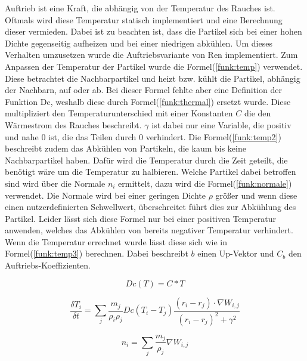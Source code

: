 \documentclass[intern,palatino]{cgBA}
\begin{document}
Auftrieb ist eine Kraft, die abhängig von der Temperatur des Rauches ist. Oftmals wird diese Temperatur statisch implementiert und eine Berechnung dieser vermieden. Dabei ist zu beachten ist, dass die Partikel sich bei einer hohen Dichte gegenseitig aufheizen und bei einer niedrigen abkühlen. Um dieses Verhalten umzusetzen wurde die Auftriebsvariante von Ren \cite{ren2016fast} implementiert.
\newline
Zum Anpassen der Temperatur der Partikel wurde die Formel(\ref{funk:temp}) verwendet. Diese betrachtet die Nachbarpartikel und heizt bzw. kühlt die Partikel, abhängig der Nachbarn, auf oder ab. Bei dieser Formel fehlte aber eine Definition der Funktion Dc, weshalb diese durch Formel(\ref{funk:thermal}) ersetzt wurde. Diese multipliziert den Temperaturunterschied mit einer Konstanten $C$ die den Wärmestrom des Rauches beschreibt. $\gamma$ ist dabei nur eine Variable, die positiv und nahe 0 ist, die das Teilen durch 0 verhindert.
\newline
Die Formel(\ref{funk:temp2}) beschreibt zudem das Abkühlen von Partikeln, die kaum bis keine Nachbarpartikel haben. Dafür wird die Temperatur durch die Zeit geteilt, die benötigt wäre um die Temperatur zu halbieren. Welche Partikel dabei betroffen sind wird über die Normale $n_i$ ermittelt, dazu wird die Formel(\ref{funk:normale}) verwendet. Die Normale wird bei einer geringen Dichte $\rho$ größer und wenn diese einen nutzerdefinierten Schwellwert, überschreitet führt dies zur Abkühlung des Partikel. Leider lässt sich diese Formel nur bei einer positiven Temperatur anwenden, welches das Abkühlen von bereits negativer Temperatur verhindert.
\newline
Wenn die Temperatur errechnet wurde lässt diese sich wie in Formel(\ref{funk:temp3}) berechnen. Dabei beschreibt $b$ einen Up-Vektor und $C_b$ den Auftriebs-Koeffizienten.

\begin{equation}\label{funk:thermal}
Dc(T)  = C * T
\end{equation}

\begin{equation}\label{funk:temp}
\frac{\delta T_i}{\delta t}  = \sum_j \frac{m_j}{\rho_i \rho_j} Dc(T_i - T_j) \frac{(r_i-r_j) \cdot \nabla W_{i,j}}{(r_i-r_j)^2 + \gamma^2}
\end{equation}

\begin{equation}\label{funk:normale}
n_i  = \sum_j \frac{m_j}{\rho_j} \nabla W_{i,j}
\end{equation}
\end{document}

